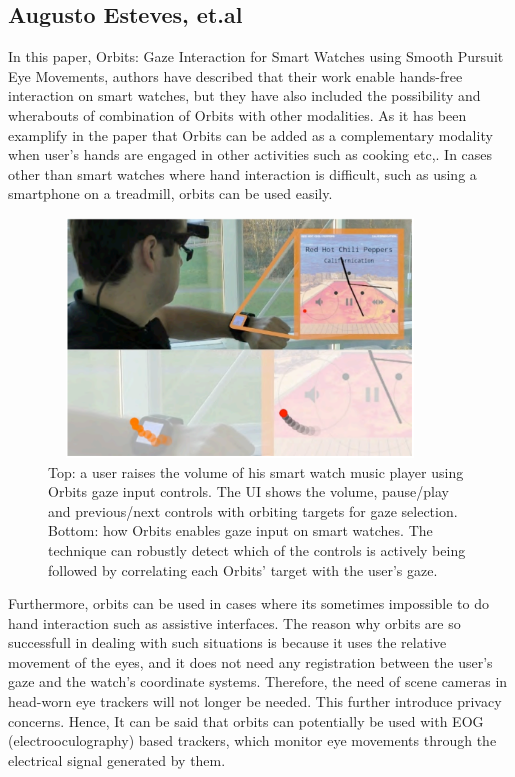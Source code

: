 \subsection{Augusto Esteves, et.al \cite{18} \cite{19}}

In this paper, Orbits: Gaze Interaction for Smart Watches using Smooth Pursuit Eye Movements, authors have described that their work enable hands-free interaction on smart watches, but they have also included the possibility and wherabouts of combination of Orbits with other modalities. As it has been examplify in the paper that Orbits can be added as a complementary modality when user's hands are engaged in other activities such as cooking etc,. In cases other than smart watches where hand interaction is difficult, such as using a smartphone on a treadmill, orbits can be used easily.

\begin{figure}[!hbt]
  \centering
  \includegraphics[width=4in,height=2.5in]{augusto.png}
  \caption{Top: a user raises the volume of his smart watch music player using Orbits gaze input controls. The UI shows the volume, pause/play and previous/next controls with orbiting targets for gaze selection. Bottom: how Orbits enables gaze input on smart watches. The technique can robustly detect which of the controls is actively being followed by correlating each Orbits’ target with the user’s gaze.}
  \label{augusto}
\end{figure}

Furthermore, orbits can be used in cases where its sometimes impossible to do hand interaction such as assistive interfaces. The reason why orbits are so successfull in dealing with such situations is because it uses the relative movement of the eyes, and it does not need any registration between the user’s gaze and the watch’s coordinate systems. Therefore, the need of scene cameras in head-worn eye trackers will not longer be needed. This further introduce privacy concerns. Hence, It can be said that orbits can potentially be used with EOG (electrooculography) based trackers, which monitor eye movements through the electrical signal generated by them.\\

